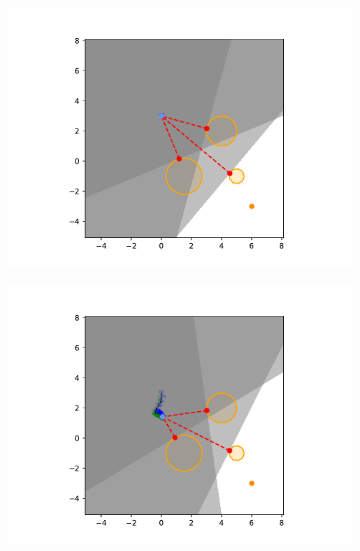 \begin{figure}[H]
    \centering
    \begin{subfigure}{0.20\textwidth}
        \centering
        \includegraphics[width=\textwidth]{figures/Simulations/sim1circles/frame_0.pdf}
    \end{subfigure}%
    \hfill
    \begin{subfigure}{0.20\textwidth}
        \centering
        \includegraphics[width=\textwidth]{figures/Simulations/sim1circles/frame_1.pdf}
    \end{subfigure}%
    \hfill
    \begin{subfigure}{0.20\textwidth}
        \centering

\end{subfigure}
\end{figure}
